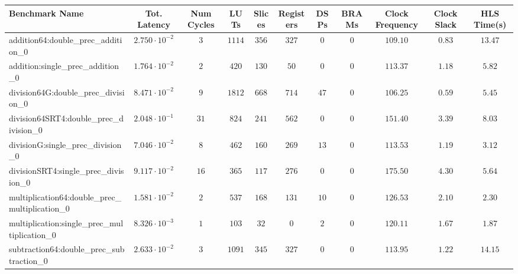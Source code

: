\begin{tabular}{|l|c|c|c|c|c|c|c|c|c|c|}
\hline
Benchmark Name                                   & Tot. Latency            & Num Cycles & LUTs     & Slices   & Registers & DSPs   & BRAMs & Clock Frequency & Clock Slack & HLS Time(s) \\
\hline
addition64:double\_prec\_addition\_0             & $ 2.750 \cdot 10^{-2} $ & $ 3      $ & $ 1114 $ & $ 356  $ & $ 327   $ & $ 0  $ & $ 0 $ & $ 109.10      $ & $ 0.83    $ & $ 13.47   $ \\
addition:single\_prec\_addition\_0               & $ 1.764 \cdot 10^{-2} $ & $ 2      $ & $ 420  $ & $ 130  $ & $ 50    $ & $ 0  $ & $ 0 $ & $ 113.37      $ & $ 1.18    $ & $ 5.82    $ \\
division64G:double\_prec\_division\_0            & $ 8.471 \cdot 10^{-2} $ & $ 9      $ & $ 1812 $ & $ 668  $ & $ 714   $ & $ 47 $ & $ 0 $ & $ 106.25      $ & $ 0.59    $ & $ 5.45    $ \\
division64SRT4:double\_prec\_division\_0         & $ 2.048 \cdot 10^{-1} $ & $ 31     $ & $ 824  $ & $ 241  $ & $ 562   $ & $ 0  $ & $ 0 $ & $ 151.40      $ & $ 3.39    $ & $ 8.03    $ \\
divisionG:single\_prec\_division\_0              & $ 7.046 \cdot 10^{-2} $ & $ 8      $ & $ 462  $ & $ 160  $ & $ 269   $ & $ 13 $ & $ 0 $ & $ 113.53      $ & $ 1.19    $ & $ 3.12    $ \\
divisionSRT4:single\_prec\_division\_0           & $ 9.117 \cdot 10^{-2} $ & $ 16     $ & $ 365  $ & $ 117  $ & $ 276   $ & $ 0  $ & $ 0 $ & $ 175.50      $ & $ 4.30    $ & $ 5.64    $ \\
multiplication64:double\_prec\_multiplication\_0 & $ 1.581 \cdot 10^{-2} $ & $ 2      $ & $ 537  $ & $ 168  $ & $ 131   $ & $ 10 $ & $ 0 $ & $ 126.53      $ & $ 2.10    $ & $ 2.30    $ \\
multiplication:single\_prec\_multiplication\_0   & $ 8.326 \cdot 10^{-3} $ & $ 1      $ & $ 103  $ & $ 32   $ & $ 0     $ & $ 2  $ & $ 0 $ & $ 120.11      $ & $ 1.67    $ & $ 1.87    $ \\
subtraction64:double\_prec\_subtraction\_0       & $ 2.633 \cdot 10^{-2} $ & $ 3      $ & $ 1091 $ & $ 345  $ & $ 327   $ & $ 0  $ & $ 0 $ & $ 113.95      $ & $ 1.22    $ & $ 14.15   $ \\

\end{tabular}
